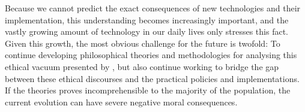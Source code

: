 \documentclass{article}
\begin{document}
Because we cannot predict the exact consequences of new technologies and their implementation, this understanding becomes increasingly important, and the vastly growing amount of technology in our daily lives only stresses this fact. Given this growth, the most obvious challenge for the future is twofold: To continue developing philosophical theories and methodologies for analysing this ethical vacuum presented by \cite{Moor:1985}, but also continue working to bridge the gap between these ethical discourses and the practical policies and implementations. If the theories proves incomprehensible to the majority of the population, the current evolution can have severe negative moral consequences.
\pagebreak

\end{document}
